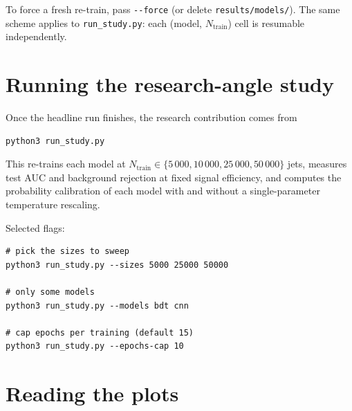 \documentclass[11pt,a4paper]{article}
\begin{document}
\noindent To force a fresh re-train, pass \verb|--force| (or delete
\texttt{results/models/}).  The same scheme applies to
\texttt{run\_study.py}: each (model, $N_{\text{train}}$) cell is
resumable independently.

\section{Running the research-angle study}\label{sec:study}

Once the headline run finishes, the research contribution comes from
\begin{lstlisting}[style=shell]
python3 run_study.py
\end{lstlisting}

This re-trains each model at $N_{\text{train}} \in
\{5\,000, 10\,000, 25\,000, 50\,000\}$ jets, measures test AUC and
background rejection at fixed signal efficiency, and computes the
probability calibration of each model with and without a
single-parameter temperature rescaling.

Selected flags:
\begin{lstlisting}[style=shell]
# pick the sizes to sweep
python3 run_study.py --sizes 5000 25000 50000

# only some models
python3 run_study.py --models bdt cnn

# cap epochs per training (default 15)
python3 run_study.py --epochs-cap 10
\end{lstlisting}

\section{Reading the plots}\label{sec:plots}
\end{document}
